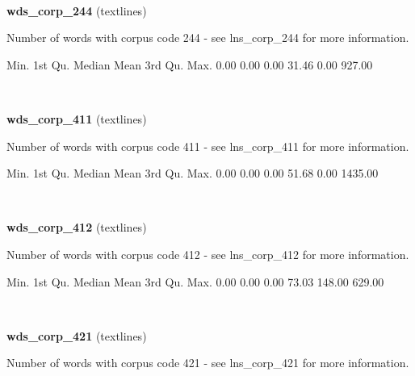 \documentclass[]{article}
\newenvironment{Shaded}{\begin{snugshade}}{\end{snugshade}}
\newcommand{\FloatTok}[1]{\textcolor[rgb]{0.00,0.00,0.81}{{#1}}}
\newcommand{\NormalTok}[1]{{#1}}
\begin{document}
~

\vspace{1em}

\textbf{wds\_corp\_244} (textlines)

Number of words with corpus code 244 - see lns\_corp\_244 for more
information.

\begin{Shaded}
\begin{Highlighting}[]
   \NormalTok{Min. 1st Qu.  Median    Mean 3rd Qu.    Max. }
   \FloatTok{0.00}    \FloatTok{0.00}    \FloatTok{0.00}   \FloatTok{31.46}    \FloatTok{0.00}  \FloatTok{927.00} 
\end{Highlighting}
\end{Shaded}

~

\vspace{1em}

\textbf{wds\_corp\_411} (textlines)

Number of words with corpus code 411 - see lns\_corp\_411 for more
information.

\begin{Shaded}
\begin{Highlighting}[]
   \NormalTok{Min. 1st Qu.  Median    Mean 3rd Qu.    Max. }
   \FloatTok{0.00}    \FloatTok{0.00}    \FloatTok{0.00}   \FloatTok{51.68}    \FloatTok{0.00} \FloatTok{1435.00} 
\end{Highlighting}
\end{Shaded}

~

\vspace{1em}

\textbf{wds\_corp\_412} (textlines)

Number of words with corpus code 412 - see lns\_corp\_412 for more
information.

\begin{Shaded}
\begin{Highlighting}[]
   \NormalTok{Min. 1st Qu.  Median    Mean 3rd Qu.    Max. }
   \FloatTok{0.00}    \FloatTok{0.00}    \FloatTok{0.00}   \FloatTok{73.03}  \FloatTok{148.00}  \FloatTok{629.00} 
\end{Highlighting}
\end{Shaded}

~

\vspace{1em}

\textbf{wds\_corp\_421} (textlines)

Number of words with corpus code 421 - see lns\_corp\_421 for more
information.
\end{document}
